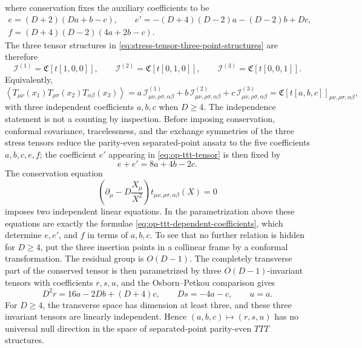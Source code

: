 where conservation fixes the auxiliary coefficients to be
\begin{align}
  e=(D+2)(Da+b-c),
  \qquad
  e'=-(D+4)(D-2)a-(D-2)b+Dc,
  \nonumber\\
  f=(D+4)(D-2)(4a+2b-c).
  \label{eq:op-ttt-dependent-coefficients}
\end{align}
The three tensor structures in
\eqref{eq:stress-tensor-three-point-structures} are therefore
\[
  \mathcal I^{(1)}=\mathfrak C[t[1,0,0]],
  \qquad
  \mathcal I^{(2)}=\mathfrak C[t[0,1,0]],
  \qquad
  \mathcal I^{(3)}=\mathfrak C[t[0,0,1]].
\]
Equivalently,
\begin{equation}
  \left\langle
    T_{\mu\nu}(x_1)T_{\rho\sigma}(x_2)T_{\alpha\beta}(x_3)
  \right\rangle
  =
  a\,\mathcal I^{(1)}_{\mu\nu,\rho\sigma,\alpha\beta}
  +
  b\,\mathcal I^{(2)}_{\mu\nu,\rho\sigma,\alpha\beta}
  +
  c\,\mathcal I^{(3)}_{\mu\nu,\rho\sigma,\alpha\beta}
  =
  \mathfrak C[t[a,b,c]]_{\mu\nu,\rho\sigma,\alpha\beta},
  \label{eq:stress-tensor-three-point-structures}
\end{equation}
with three independent coefficients \(a,b,c\) when \(D\ge4\).  The
independence statement is not a counting by inspection.  Before imposing
conservation, conformal covariance, tracelessness, and the exchange symmetries
of the three stress tensors reduce the parity-even separated-point ansatz to
the five coefficients \(a,b,c,e,f\); the coefficient \(e'\) appearing in
\eqref{eq:op-ttt-tensor} is then fixed by
\[
  e+e'=8a+4b-2c .
\]
The conservation equation
\[
  \left(\partial_\mu-D\frac{X_\mu}{X^2}\right)
  t_{\mu\nu,\rho\sigma,\alpha\beta}(X)=0
\]
imposes two independent linear equations.  In the parametrization above these
equations are exactly the formulae
\eqref{eq:op-ttt-dependent-coefficients}, which determine
\(e,e'\), and \(f\) in terms of \(a,b,c\).  To see that no further relation is
hidden for \(D\ge4\), put the three insertion points in a collinear frame by a
conformal transformation.  The residual group is \(O(D-1)\).  The completely
transverse part of the conserved tensor is then parametrized by three
\(O(D-1)\)-invariant tensors with coefficients \(r,s,u\), and the
Osborn--Petkou comparison gives
\begin{equation}
  D^2 r=16a-2Db+(D+4)c,
  \qquad
  D s=-4a-c,
  \qquad
  u=a .
  \label{eq:op-collinear-rsu}
\end{equation}
For \(D\ge4\), the transverse space has dimension at least three, and these
three invariant tensors are linearly independent.  Hence
\((a,b,c)\mapsto(r,s,u)\) has no universal null direction in the space of
separated-point parity-even \(TTT\) structures.

